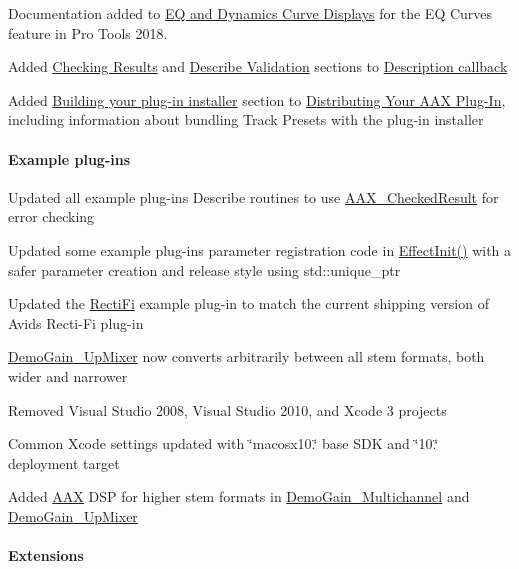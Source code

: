 \begin{DoxyItemize}
\item Documentation added to \hyperlink{a00342}{E\+Q and Dynamics Curve Displays} for the E\+Q Curves feature in Pro Tools 2018.  
\item Added \hyperlink{a00326_describe_checking_results}{Checking Results} and \hyperlink{a00326_describe_validation}{Describe Validation} sections to \hyperlink{a00326}{Description callback}  
\item Added \hyperlink{a00372_aax_distributing_installer}{Building your plug-\/in installer} section to \hyperlink{a00372}{Distributing Your A\+A\+X Plug-\/\+In}, including information about bundling Track Presets with the plug-\/in installer  
\end{DoxyItemize}\hypertarget{a00375_aax_sdk_2p3p1_ExamplePlugIns}{}\paragraph{Example plug-\/ins}\label{a00375_aax_sdk_2p3p1_ExamplePlugIns}

\begin{DoxyItemize}
\item Updated all example plug-\/ins\textquotesingle{} Describe routines to use \hyperlink{a00019}{A\+A\+X\+\_\+\+Checked\+Result} for error checking  
\item Updated some example plug-\/ins\textquotesingle{} parameter registration code in \hyperlink{a00018_a2e302fd758d39a6a855023bf825fe148}{Effect\+Init()} with a safer parameter creation and release style using std\+::unique\+\_\+ptr  
\item Updated the \hyperlink{a00376_RectiFi}{Recti\+Fi} example plug-\/in to match the current shipping version of Avid\textquotesingle{}s Recti-\/\+Fi plug-\/in  
\item \hyperlink{a00376_DemoGain_UpMixer}{Demo\+Gain\+\_\+\+Up\+Mixer} now converts arbitrarily between all stem formats, both wider and narrower  
\item Removed Visual Studio 2008, Visual Studio 2010, and Xcode 3 projects  
\item Common Xcode settings updated with \char`\"{}macosx10.\char`\"{} base S\+D\+K and \char`\"{}10.\char`\"{} deployment target  
\item Added \hyperlink{a00288}{A\+A\+X} D\+S\+P for higher stem formats in \hyperlink{a00376_DemoGain_Multichannel}{Demo\+Gain\+\_\+\+Multichannel} and \hyperlink{a00376_DemoGain_UpMixer}{Demo\+Gain\+\_\+\+Up\+Mixer}  
\end{DoxyItemize}\hypertarget{a00375_aax_sdk_2p3p1_Extensions}{}\paragraph{Extensions}\label{a00375_aax_sdk_2p3p1_Extensions}

